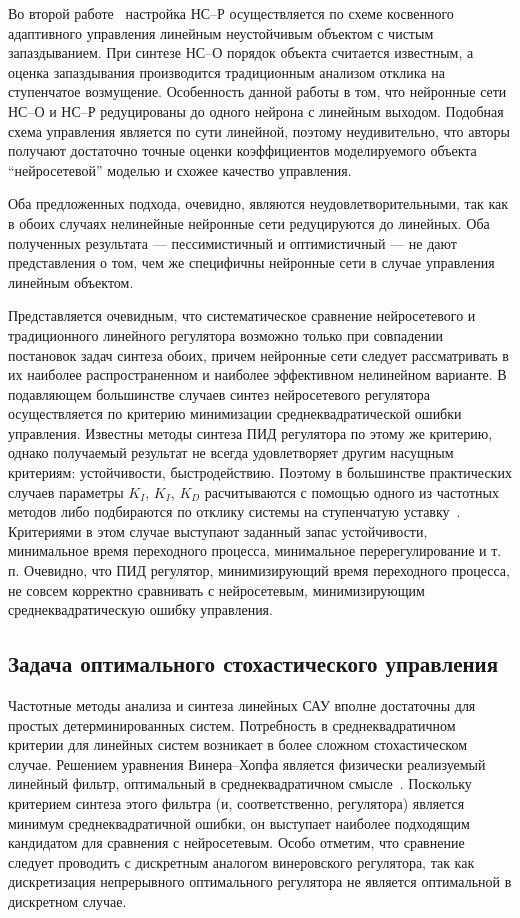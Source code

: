 Во второй работе~\cite{toudeft} настройка НС--Р осуществляется по
схеме косвенного адаптивного управления линейным неустойчивым объектом
с чистым запаздыванием.  При синтезе НС--О порядок объекта считается
известным, а оценка запаздывания производится традиционным анализом
отклика на ступенчатое возмущение.  Особенность данной работы в том,
что нейронные сети НС--О и НС--Р редуцированы до одного нейрона с
линейным выходом.  Подобная схема управления является по сути
линейной, поэтому неудивительно, что авторы получают достаточно точные
оценки коэффициентов моделируемого объекта ``нейросетевой'' моделью и
схожее качество управления.

Оба предложенных подхода, очевидно, являются неудовлетворительными,
так как в обоих случаях нелинейные нейронные сети редуцируются до
линейных.  Оба полученных результата --- пессимистичный и
оптимистичный --- не дают представления о том, чем же специфичны
нейронные сети в случае управления линейным объектом.

Представляется очевидным, что систематическое сравнение нейросетевого
и традиционного линейного регулятора возможно только при совпадении
постановок задач синтеза обоих, причем нейронные сети следует
рассматривать в их наиболее распространенном и наиболее эффективном
нелинейном варианте.  В подавляющем большинстве случаев синтез
нейросетевого регулятора осуществляется по критерию минимизации
среднеквадратической ошибки управления.  Известны методы синтеза ПИД
регулятора по этому же критерию, однако получаемый результат не всегда
удовлетворяет другим насущным критериям: устойчивости, быстродействию.
Поэтому в большинстве практических случаев параметры $K_I$, $K_I$,
$K_D$ расчитываются с помощью одного из частотных методов либо
подбираются по отклику системы на ступенчатую
уставку~\cite{kurop73,netush68}.  Критериями в этом случае
выступают заданный запас устойчивости, минимальное время переходного
процесса, минимальное перерегулирование и т. п.  Очевидно, что ПИД
регулятор, минимизирующий время переходного процесса, не совсем
корректно сравнивать с нейросетевым, минимизирующим среднеквадратическую
ошибку управления.

\subsection{Задача оптимального стохастического управления}

Частотные методы анализа и синтеза линейных САУ вполне достаточны для
простых детерминированных систем.  Потребность в среднеквадратичном
критерии для линейных систем возникает в более сложном стохастическом
случае.  Решением уравнения Винера--Хопфа является физически
реализуемый линейный фильтр, оптимальный в среднеквадратичном
смысле~\cite{solod60,skliar65,ostrem73,tsipkin58}.
Поскольку критерием синтеза этого фильтра (и, соответственно,
регулятора) является минимум среднеквадратичной ошибки, он выступает
наиболее подходящим кандидатом для сравнения с нейросетевым.  Особо
отметим, что сравнение следует проводить с дискретным аналогом
винеровского регулятора, так как дискретизация непрерывного
оптимального регулятора не является оптимальной в дискретном случае.

